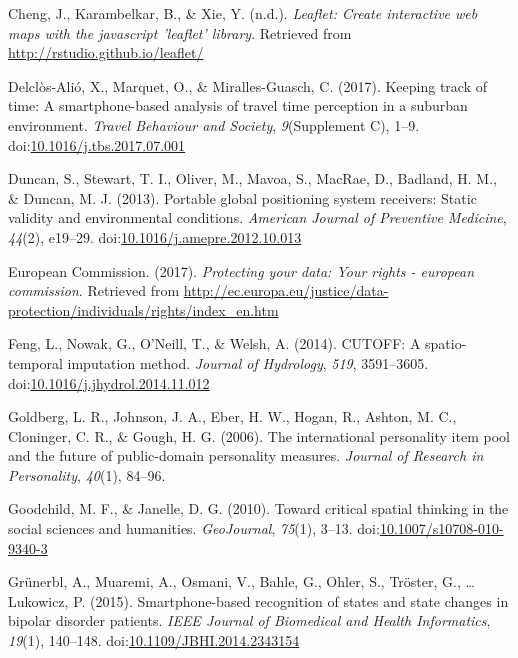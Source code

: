 \documentclass[man]{apa6}
\theoremstyle{definition}
\theoremstyle{definition}
\theoremstyle{definition}
\theoremstyle{remark}
\begin{document}
\hypertarget{ref-R-leaflet}{}
Cheng, J., Karambelkar, B., \& Xie, Y. (n.d.). \emph{Leaflet: Create
interactive web maps with the javascript 'leaflet' library}. Retrieved
from \url{http://rstudio.github.io/leaflet/}

\hypertarget{ref-delclos-alio_keeping_2017}{}
Delclòs-Alió, X., Marquet, O., \& Miralles-Guasch, C. (2017). Keeping
track of time: A smartphone-based analysis of travel time perception in
a suburban environment. \emph{Travel Behaviour and Society},
\emph{9}(Supplement C), 1--9.
doi:\href{https://doi.org/10.1016/j.tbs.2017.07.001}{10.1016/j.tbs.2017.07.001}

\hypertarget{ref-duncan_portable_2013}{}
Duncan, S., Stewart, T. I., Oliver, M., Mavoa, S., MacRae, D., Badland,
H. M., \& Duncan, M. J. (2013). Portable global positioning system
receivers: Static validity and environmental conditions. \emph{American
Journal of Preventive Medicine}, \emph{44}(2), e19--29.
doi:\href{https://doi.org/10.1016/j.amepre.2012.10.013}{10.1016/j.amepre.2012.10.013}

\hypertarget{ref-commission_protecting_2017}{}
European Commission. (2017). \emph{Protecting your data: Your rights -
european commission}. Retrieved from
\url{http://ec.europa.eu/justice/data-protection/individuals/rights/index_en.htm}

\hypertarget{ref-feng_cutoff:_2014}{}
Feng, L., Nowak, G., O'Neill, T., \& Welsh, A. (2014). CUTOFF: A
spatio-temporal imputation method. \emph{Journal of Hydrology},
\emph{519}, 3591--3605.
doi:\href{https://doi.org/10.1016/j.jhydrol.2014.11.012}{10.1016/j.jhydrol.2014.11.012}

\hypertarget{ref-goldberg_international_2006}{}
Goldberg, L. R., Johnson, J. A., Eber, H. W., Hogan, R., Ashton, M. C.,
Cloninger, C. R., \& Gough, H. G. (2006). The international personality
item pool and the future of public-domain personality measures.
\emph{Journal of Research in Personality}, \emph{40}(1), 84--96.

\hypertarget{ref-goodchild_toward_2010}{}
Goodchild, M. F., \& Janelle, D. G. (2010). Toward critical spatial
thinking in the social sciences and humanities. \emph{GeoJournal},
\emph{75}(1), 3--13.
doi:\href{https://doi.org/10.1007/s10708-010-9340-3}{10.1007/s10708-010-9340-3}

\hypertarget{ref-grunerbl_smartphone-based_2015}{}
Grünerbl, A., Muaremi, A., Osmani, V., Bahle, G., Ohler, S., Tröster,
G., \ldots{} Lukowicz, P. (2015). Smartphone-based recognition of states
and state changes in bipolar disorder patients. \emph{IEEE Journal of
Biomedical and Health Informatics}, \emph{19}(1), 140--148.
doi:\href{https://doi.org/10.1109/JBHI.2014.2343154}{10.1109/JBHI.2014.2343154}
\end{document}
